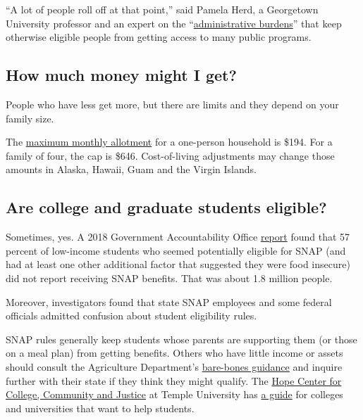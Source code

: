 ``A lot of people roll off at that point,'' said Pamela Herd, a
Georgetown University professor and an expert on the
``\href{https://www.russellsage.org/publications/administrative-burden}{administrative
burdens}'' that keep otherwise eligible people from getting access to
many public programs.

\hypertarget{how-much-money-might-i-get}{%
\subsection{How much money might I
get?}\label{how-much-money-might-i-get}}

People who have less get more, but there are limits and they depend on
your family size.

The \href{https://www.fns.usda.gov/snap/recipient/eligibility}{maximum
monthly allotment} for a one-person household is \$194. For a family of
four, the cap is \$646. Cost-of-living adjustments may change those
amounts in Alaska, Hawaii, Guam and the Virgin Islands.

\hypertarget{are-college-and-graduate-students-eligible}{%
\subsection{Are college and graduate students
eligible?}\label{are-college-and-graduate-students-eligible}}

Sometimes, yes. A 2018 Government Accountability Office
\href{https://www.gao.gov/assets/700/696254.pdf}{report} found that 57
percent of low-income students who seemed potentially eligible for SNAP
(and had at least one other additional factor that suggested they were
food insecure) did not report receiving SNAP benefits. That was about
1.8 million people.

Moreover, investigators found that state SNAP employees and some federal
officials admitted confusion about student eligibility rules.

SNAP rules generally keep students whose parents are supporting them (or
those on a meal plan) from getting benefits. Others who have little
income or assets should consult the Agriculture Department's
\href{https://www.fns.usda.gov/snap/students}{bare-bones guidance} and
inquire further with their state if they think they might qualify. The
\href{https://hope4college.com/about-the-hope-center/}{Hope Center for
College, Community and Justice} at Temple University has
\href{https://hope4college.com/wp-content/uploads/2019/04/Beyond-the-Food-Pantry-Student-Access-to-SNAP.pdf}{a
guide} for colleges and universities that want to help students.


